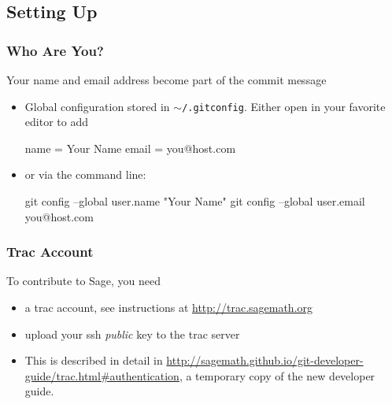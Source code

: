 \subsection{Setting Up}


\begin{frame}[fragile]
  \frametitle{Who Are You?}

  Your name and email address become part of the commit message 
  \begin{itemize}
  \item Global configuration stored in $\sim$\verb#/.gitconfig#. Either
    open in your favorite editor to add
    \begin{shell}
    [user]
        name = Your Name
        email = you@host.com
    \end{shell}
  \item or via the command line:
    \begin{shell}
git config --global user.name "Your Name"
git config --global user.email you@host.com
    \end{shell}    
  \end{itemize}

\end{frame}


\begin{frame}[fragile]
  \frametitle{Trac Account}
  
  To contribute to Sage, you need 
  \begin{itemize}
  \item a trac account, see instructions at \url{http://trac.sagemath.org}
  \item upload your ssh \emph{public} key to the trac server
  \item This is described in detail in
    \url{http://sagemath.github.io/git-developer-guide/trac.html#authentication},
    a temporary copy of the new developer guide.
  \end{itemize}
  
\end{frame}



